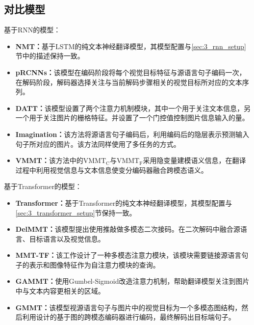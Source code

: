 \subsection{对比模型}
基于RNN的模型：
\begin{itemize}
    \item \textbf{NMT：}基于LSTM的纯文本神经翻译模型，其模型配置与\ref{sec:3_rnn_setup}节中的描述保持一致。
    \item \textbf{pRCNNs\cite{35_huang-etal-2016-attention}：}该模型在编码阶段将每个视觉目标特征与源语言句子编码一次，在解码阶段，解码器选择关注与当前解码步骤相关的视觉目标所对应的文本序列。
    \item \textbf{DATT\cite{36_calixto-etal-2017-doubly}：}该模型设置了两个注意力机制模块，其中一个用于关注文本信息，另一个用于关注图片的栅格特征。并设置了一个门控值控制图片信息输入的量。
    \item \textbf{Imagination\cite{37_elliott-kadar-2017-imagination}：}该方法将源语言句子编码后，利用编码后的隐层表示预测输入句子所对应的图片。该方法同样使用了多任务的方式。
    \item \textbf{VMMT\cite{38_calixto-etal-2019-latent}：}该方法中的$ \mathrm{VMMT_C} $与$ \mathrm{VMMT_F} $采用隐变量建模语义信息，在翻译过程中利用视觉信息与文本信息使变分编码器融合跨模态语义。
\end{itemize}

基于Transformer的模型：
\begin{itemize}
    \item \textbf{Transformer：}基于Transformer的纯文本神经翻译模型，其模型配置与\ref{sec:3_transformer_setup}节保持一致。
    \item \textbf{DelMMT\cite{39_ive-etal-2019-distilling}：}该模型提出使用推敲做多模态二次接码。在二次解码中融合源语言、目标语言以及视觉信息。
    \item \textbf{MMT-TF\cite{40_yao-wan-2020-multimodal}：}该工作设计了一种多模态注意力模块，该模块需要链接源语言句子的表示和图像特征作为自注意力模块的查询。
    \item \textbf{GAMMT\cite{41_DBLP:journals/corr/abs-2103-08862}：}使用Gumbel-Sigmoid改造注意力机制，帮助翻译模型关注到图片中与文本内容更相关的区域。
    \item \textbf{GMMT\cite{33_yin-etal-2020-novel}：}该模型视源语言句子与图片中的视觉目标为一个多模态图结构，然后利用设计的基于图的跨模态编码器进行编码，最终解码出目标端句子。
\end{itemize}
